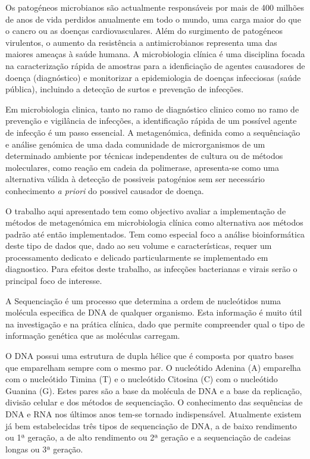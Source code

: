 Os patogéneos microbianos são actualmente responsáveis por mais de 400 milhões de anos de vida perdidos anualmente em todo o mundo, uma carga maior do que o cancro ou as doenças cardiovasculares. Além do surgimento de patogéneos virulentos, o aumento da resistência a antimicrobianos representa uma das maiores ameaças à saúde humana. A microbiologia clínica é uma disciplina focada na caracterização rápida de amostras para a idenficiação de agentes causadores de doença (diagnóstico) e monitorizar a epidemiologia de doenças infecciosas (saúde pública), incluindo a detecção de surtos e prevenção de infecções. 

Em microbiologia clinica, tanto no ramo de diagnóstico clinico como no ramo de prevenção e vigilância de infecções, a identificação rápida de um possível agente de infecção é um passo essencial. 
A metagenómica, definida como a sequênciação e análise genómica de uma dada comunidade de microrganismos de um determinado ambiente por técnicas independentes de cultura ou de métodos moleculares, como reação em cadeia da polimerase, apresenta-se como uma alternativa válida à detecção de possiveis patogénios sem ser necessário conhecimento \textit{a priori} do possivel causador de doença.

O trabalho aqui apresentado tem como objectivo avaliar a implementação de métodos de metagenómica em microbiologia clínica como alternativa aos métodos padrão até então implementados. Tem como especial foco a análise bioinformática deste tipo de dados que, dado ao seu volume e características, requer um processamento dedicato e delicado particularmente se implementado em diagnostico. Para efeitos deste trabalho, as infecções bacterianas e virais serão o principal foco de interesse.  

A Sequenciação é um processo que determina a ordem de nucleótidos numa molécula especifica de DNA de qualquer organismo. Esta informação é muito útil na investigação e na prática clínica, dado que permite compreender qual o tipo de informação genética que as moléculas carregam. 

O DNA possui uma estrutura de dupla hélice que é composta por quatro bases que emparelham sempre com o mesmo par. O nucleótido Adenina (A) emparelha com o nucleótido Timina (T) e o nucleótido Citosina (C) com o nucleótido Guanina (G). Estes pares são a base da molécula de DNA e a base da replicação, divisão celular e dos métodos de sequenciação. O conhecimento das sequências de DNA e RNA nos últimos anos tem-se tornado indispensável. Atualmente existem já bem estabelecidas três tipos de sequenciação de DNA, a de baixo rendimento ou 1ª geração, a de alto rendimento ou 2ª geração e a sequenciação de cadeias longas ou 3ª geração.

